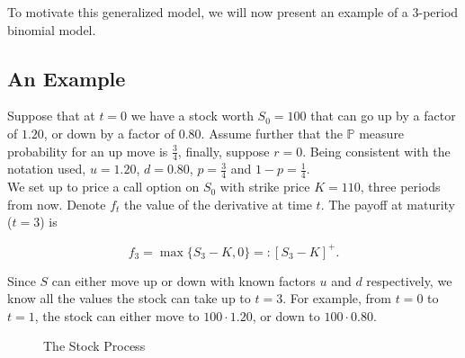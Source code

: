 \documentclass[../TGMAFFIRO.tex]{subfiles}
\begin{document}
To motivate this generalized model, we will now present an example of a $3$-period binomial model.
\subsection{An Example}
Suppose that at $t=0$ we have a stock worth $S_0=100$ that can go up by a factor of $1.20$, or down by a factor of $0.80$. Assume further that the $\mathbb{P}$ measure probability for an up move is $\frac{3}{4}$, finally, suppose $r=0$. Being consistent with the notation used, $u=1.20$, $d=0.80$, $p = \frac{3}{4}$ and $ 1 - p = \frac{1}{4}$.\\

We set up to price a call option on $S_0$ with strike price $K=110$, three periods from now. Denote $f_t$ the value of the derivative at time $t$. The payoff at maturity ($t=3$) is

\begin{equation}
    f_3 = \max\{S_3 - K, 0\} =: [S_3 - K]^+.
\end{equation}

Since $S$ can either move up or down with known factors $u$ and $d$ respectively, we know all the values the stock can take up to $t=3$. For example, from $t=0$ to $t=1$, the stock can either move to $100 \cdot 1.20$, or down to $100 \cdot 0.80$.\\

\begin{figure}
\centering
{}
\caption{The Stock Process}
\end{figure}
\end{document}
